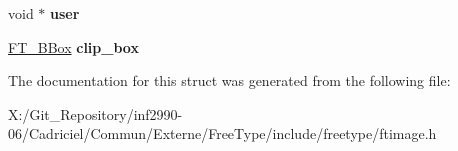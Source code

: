 \begin{DoxyCompactItemize}
\item 
\hypertarget{struct_f_t___raster___params___af78bac59f93c989840bbcbcbefd77c55}{void $\ast$ {\bfseries user}}\label{struct_f_t___raster___params___af78bac59f93c989840bbcbcbefd77c55}

\item 
\hypertarget{struct_f_t___raster___params___ab32f75f19d9cacb20e410886c055e306}{\hyperlink{struct_f_t___b_box__}{F\-T\-\_\-\-B\-Box} {\bfseries clip\-\_\-box}}\label{struct_f_t___raster___params___ab32f75f19d9cacb20e410886c055e306}

\end{DoxyCompactItemize}


The documentation for this struct was generated from the following file\-:\begin{DoxyCompactItemize}
\item 
X\-:/\-Git\-\_\-\-Repository/inf2990-\/06/\-Cadriciel/\-Commun/\-Externe/\-Free\-Type/include/freetype/ftimage.\-h\end{DoxyCompactItemize}
